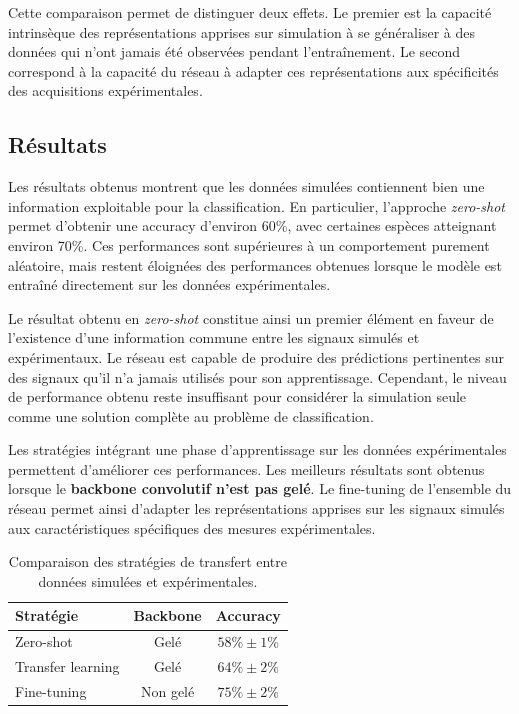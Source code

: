 \documentclass[12pt,a4paper,twoside]{article}
\begin{document}
Cette comparaison permet de distinguer deux effets. Le premier est la capacité intrinsèque des représentations apprises sur simulation à se généraliser à des données qui n'ont jamais été observées pendant l'entraînement. Le second correspond à la capacité du réseau à adapter ces représentations aux spécificités des acquisitions expérimentales.

\subsection{Résultats}
\label{subsec:res_simul}

Les résultats obtenus montrent que les données simulées contiennent bien une information exploitable pour la classification. En particulier, l'approche \textit{zero-shot} permet d'obtenir une accuracy d'environ \num{60}\%, avec certaines espèces atteignant environ \num{70}\%. Ces performances sont supérieures à un comportement purement aléatoire, mais restent éloignées des performances obtenues lorsque le modèle est entraîné directement sur les données expérimentales.

Le résultat obtenu en \textit{zero-shot} constitue ainsi un premier élément en faveur de l'existence d'une information commune entre les signaux simulés et expérimentaux. Le réseau est capable de produire des prédictions pertinentes sur des signaux qu'il n'a jamais utilisés pour son apprentissage. Cependant, le niveau de performance obtenu reste insuffisant pour considérer la simulation seule comme une solution complète au problème de classification.

Les stratégies intégrant une phase d'apprentissage sur les données expérimentales permettent d'améliorer ces performances. Les meilleurs résultats sont obtenus lorsque le \textbf{backbone convolutif n'est pas gelé}. Le fine-tuning de l'ensemble du réseau permet ainsi d'adapter les représentations apprises sur les signaux simulés aux caractéristiques spécifiques des mesures expérimentales.
\begin{table}[htbp]
\centering
\caption{Comparaison des stratégies de transfert entre données simulées et expérimentales.}
\label{tab:transfer}
\begin{tabular}{lcc}
\toprule
\textbf{Stratégie} & \textbf{Backbone} & \textbf{Accuracy} \\
\midrule
Zero-shot       & Gelé      & $58\% \pm 1\%$ \\
Transfer learning & Gelé    & $64\% \pm 2\%$ \\
Fine-tuning     & Non gelé  & $75\% \pm 2\%$ \\
\bottomrule
\end{tabular}
\end{table}
\end{document}
